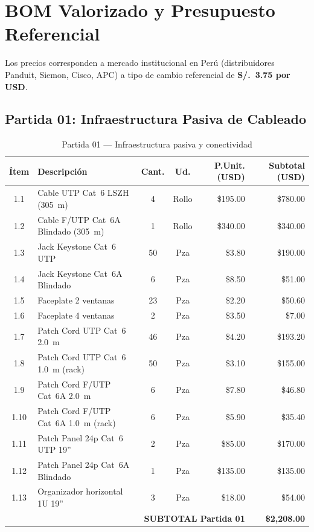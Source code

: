 \section{BOM Valorizado y Presupuesto Referencial}

Los precios corresponden a mercado institucional en Perú (distribuidores Panduit, Siemon, Cisco, APC) a tipo de cambio referencial de \textbf{S/.~3.75 por USD}.

\subsection{Partida 01: Infraestructura Pasiva de Cableado}

\begin{table}[H]
\centering
\caption{Partida 01 --- Infraestructura pasiva y conectividad}
\small
\begin{tabularx}{\textwidth}{@{} c X c c r r @{}}
\toprule
\textbf{Ítem} & \textbf{Descripción} & \textbf{Cant.} & \textbf{Ud.} & \textbf{P.Unit. (USD)} & \textbf{Subtotal (USD)} \\
\midrule
1.1  & Cable UTP Cat~6 LSZH (305~m)            & 4  & Rollo & \$195.00 & \$780.00 \\
1.2  & Cable F/UTP Cat~6A Blindado (305~m)     & 1  & Rollo & \$340.00 & \$340.00 \\
1.3  & Jack Keystone Cat~6 UTP                 & 50 & Pza   & \$3.80   & \$190.00 \\
1.4  & Jack Keystone Cat~6A Blindado           & 6  & Pza   & \$8.50   & \$51.00  \\
1.5  & Faceplate 2 ventanas                    & 23 & Pza   & \$2.20   & \$50.60  \\
1.6  & Faceplate 4 ventanas                    & 2  & Pza   & \$3.50   & \$7.00   \\
1.7  & Patch Cord UTP Cat~6 2.0~m              & 46 & Pza   & \$4.20   & \$193.20 \\
1.8  & Patch Cord UTP Cat~6 1.0~m (rack)       & 50 & Pza   & \$3.10   & \$155.00 \\
1.9  & Patch Cord F/UTP Cat~6A 2.0~m           & 6  & Pza   & \$7.80   & \$46.80  \\
1.10 & Patch Cord F/UTP Cat~6A 1.0~m (rack)    & 6  & Pza   & \$5.90   & \$35.40  \\
1.11 & Patch Panel 24p Cat~6 UTP 19''          & 2  & Pza   & \$85.00  & \$170.00 \\
1.12 & Patch Panel 24p Cat~6A Blindado         & 1  & Pza   & \$135.00 & \$135.00 \\
1.13 & Organizador horizontal 1U 19''          & 3  & Pza   & \$18.00  & \$54.00  \\
\midrule
\multicolumn{5}{r}{\textbf{SUBTOTAL Partida 01}} & \textbf{\$2,208.00} \\
\bottomrule
\end{tabularx}
\label{tab:partida01}
\end{table}

